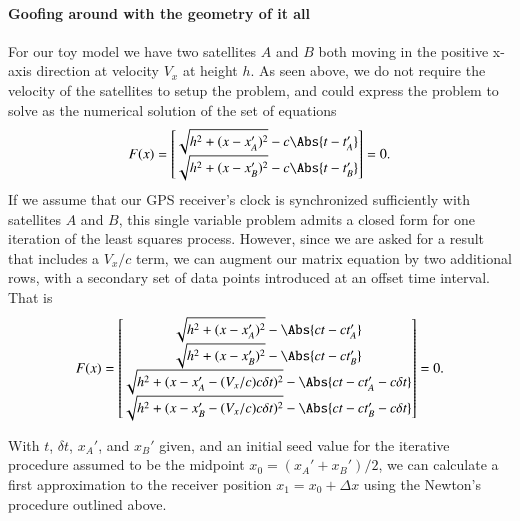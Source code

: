 \paragraph{Goofing around with the geometry of it all}
For our toy model we have two satellites \(A\) and \(B\) both moving in the positive x-axis direction at velocity \(V_x\) at height \(h\).  As seen above, we do not require the velocity of the satellites to setup the problem, and could express the problem to solve as the numerical solution of the set of equations
\begin{equation}\label{eqn:relativisticElectrodynamicsA1:350}
F(x) = 
\begin{bmatrix}
\sqrt{ h^2 + (x - x_A')^2 } - c \Abs{t - t_A'} \\
\sqrt{ h^2 + (x - x_B')^2 } - c \Abs{t - t_B'} \\
\end{bmatrix} = 0.
\end{equation}
If we assume that our GPS receiver's clock is synchronized sufficiently with satellites \(A\) and \(B\), this single variable problem admits a closed form for one iteration of the least squares process.  However, since we are asked for a result that includes a \(V_x/c\) term, we can augment our matrix equation by two additional rows, with a secondary set of data points introduced at an offset time interval.  That is
\begin{equation}\label{eqn:relativisticElectrodynamicsA1:360}
F(x) = 
\begin{bmatrix}
\sqrt{ h^2 + (x - x_A')^2 } - \Abs{c t - c t_A'} \\
\sqrt{ h^2 + (x - x_B')^2 } - \Abs{c t - c t_B'} \\
\sqrt{ h^2 + (x - x_A' - (V_x/c) c \delta t)^2 } - \Abs{c t - c t_A' - c \delta t} \\
\sqrt{ h^2 + (x - x_B' - (V_x/c) c \delta t)^2 } - \Abs{c t - c t_B' - c \delta t} \\
\end{bmatrix} = 0.
\end{equation}

With \(t\), \(\delta t\), \(x_A'\), and \(x_B'\) given, and an initial seed value for the iterative procedure assumed to be the midpoint \(x_0 = (x_A' + x_B')/2\), we can calculate a first approximation to the receiver position \(x_1 = x_0 + \Delta x\) using the Newton's procedure outlined above.

